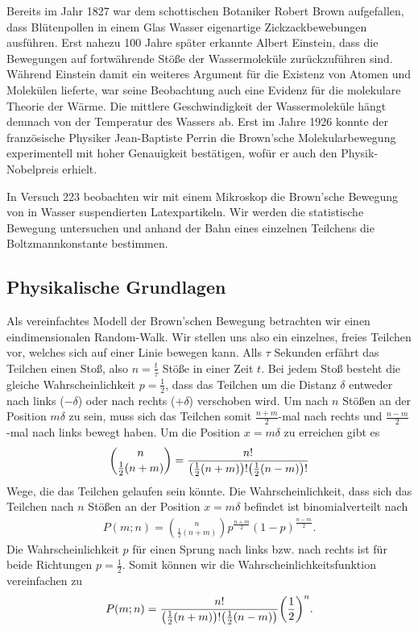 Bereits im Jahr 1827 war dem schottischen Botaniker Robert Brown aufgefallen, dass Blütenpollen in einem Glas Wasser eigenartige Zickzackbewebungen ausführen. Erst nahezu 100 Jahre später erkannte Albert Einstein, dass die Bewegungen auf fortwährende Stöße der Wassermoleküle zurückzuführen sind. Während Einstein damit ein weiteres Argument für die Existenz von Atomen und Molekülen lieferte, war seine Beobachtung auch eine Evidenz für die molekulare Theorie der Wärme. Die mittlere Geschwindigkeit der Wassermoleküle hängt demnach von der Temperatur des Wassers ab. Erst im Jahre 1926 konnte der französische Physiker Jean-Baptiste Perrin die Brown'sche Molekularbewegung experimentell mit hoher Genauigkeit bestätigen, wofür er auch den Physik-Nobelpreis erhielt.

In Versuch 223 beobachten wir mit einem Mikroskop die Brown'sche Bewegung von in Wasser suspendierten Latexpartikeln. Wir werden die statistische Bewegung untersuchen und anhand der Bahn eines einzelnen Teilchens die Boltzmannkonstante bestimmen.

\subsection{Physikalische Grundlagen}

Als vereinfachtes Modell der Brown'schen Bewegung betrachten wir einen eindimensionalen Random-Walk. Wir stellen uns also ein einzelnes, freies Teilchen vor, welches sich auf einer Linie bewegen kann. Alls $\tau$ Sekunden erfährt das Teilchen einen Stoß, also $n = \frac{t}{\tau}$ Stöße in einer Zeit $t$. Bei jedem Stoß besteht die gleiche Wahrscheinlichkeit $p = \frac{1}{2}$, dass das Teilchen um die Distanz $\delta$ entweder nach links ($-\delta$) oder nach rechts ($+\delta$) verschoben wird. Um nach $n$ Stößen an der Position $m\delta$ zu sein, muss sich das Teilchen somit $\frac{n+m}{2}$-mal nach rechts und $\frac{n-m}{2}$-mal nach links bewegt haben. Um die Position $x = m\delta$ zu erreichen gibt es
\begin{align}
  \binom{n}{\frac{1}{2}(n+m)} = \frac{n!}{\qty(\frac{1}{2}(n+m))!\qty(\frac{1}{2}(n-m))!}
\end{align}
Wege, die das Teilchen gelaufen sein könnte. Die Wahrscheinlichkeit, dass sich das Teilchen nach $n$ Stößen an der Position $x = m\delta$ befindet ist binomialverteilt nach
\begin{align}
  P(m;n) = \binom{n}{\frac{1}{2}(n+m)} p^{\frac{n+m}{2}} (1-p)^{\frac{n-m}{2}}.
\end{align}
Die Wahrscheinlichkeit $p$ für einen Sprung nach links bzw. nach rechts ist für beide Richtungen $p = \frac{1}{2}$. Somit können wir die Wahrscheinlichkeitsfunktion vereinfachen zu
\begin{align}
  P(m;n) = \frac{n!}{\qty(\frac{1}{2}(n+m))!\qty(\frac{1}{2}(n-m))}\qty(\frac{1}{2})^n.
\end{align}

